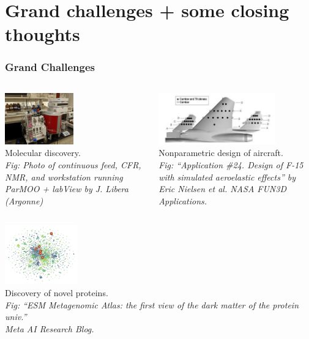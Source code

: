 \documentclass[aspectratio=169]{beamer}
\begin{document}
\section{Grand challenges + some closing thoughts}

\begin{frame}\frametitle{Grand Challenges}

\begin{columns}
\begin{column}{0.5\textwidth}
\begin{center}
\includegraphics[height=6em]{../img/probs/cfr-nmr-setup.jpg}\\
{\small
Molecular discovery.\\
}
{\tiny \sl
Fig: Photo of continuous feed, CFR, NMR, and workstation running
ParMOO + labView
by J. Libera (Argonne)\\
}
\end{center}
\end{column}
\begin{column}{0.5\textwidth}
\begin{center}
\includegraphics[height=6em]{../img/probs/nasa-f15.png}\\
{\small
Nonparametric design of aircraft.\\
}
{\tiny \sl
Fig: ``Application \#24. Design of F-15 with simulated aeroelastic effects''
by Eric Nielsen et al.
NASA FUN3D Applications.\\
}
\end{center}
\end{column}
\end{columns}
\begin{center}
\includegraphics[height=7em]{../img/probs/meta-protein.png}\\
{\small
Discovery of novel proteins.\\
}
{\tiny \sl
Fig: ``ESM Metagenomic Atlas: the first view of the dark matter of the protein
univ.''\\
Meta AI Research Blog.\\
}
\end{center}

\end{frame}
\end{document}
